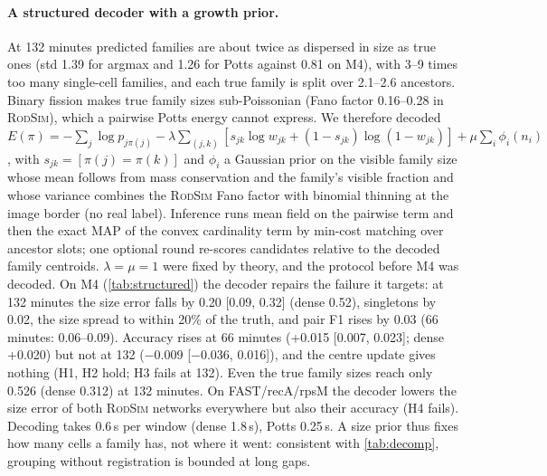 \documentclass[10pt,twocolumn,letterpaper]{article}
\newcommand{\rodsim}{\textsc{RodSim}\xspace}
\begin{document}
\paragraph{A structured decoder with a growth prior.}
At 132 minutes predicted families are about twice as dispersed in size as true ones (std 1.39 for argmax and 1.26 for Potts against 0.81 on M4), with 3--9 times too many single-cell families, and each true family is split over 2.1--2.6 ancestors. Binary fission makes true family sizes sub-Poissonian (Fano factor 0.16--0.28 in \rodsim), which a pairwise Potts energy cannot express. We therefore decoded
$E(\pi) = -\sum_j \log p_{j\pi(j)} - \lambda \sum_{(j,k)} [s_{jk}\log w_{jk} + (1{-}s_{jk})\log(1{-}w_{jk})] + \mu \sum_i \phi_i(n_i)$,
with $s_{jk}{=}[\pi(j){=}\pi(k)]$ and $\phi_i$ a Gaussian prior on the visible family size whose mean follows from mass conservation and the family's visible fraction and whose variance combines the \rodsim Fano factor with binomial thinning at the image border (no real label). Inference runs mean field on the pairwise term and then the exact MAP of the convex cardinality term by min-cost matching over ancestor slots; one optional round re-scores candidates relative to the decoded family centroids. $\lambda{=}\mu{=}1$ were fixed by theory, and the protocol before M4 was decoded. On M4 (\cref{tab:structured}) the decoder repairs the failure it targets: at 132 minutes the size error falls by 0.20 [0.09, 0.32] (dense 0.52), singletons by 0.02, the size spread to within 20\% of the truth, and pair F1 rises by 0.03 (66 minutes: 0.06--0.09). Accuracy rises at 66 minutes (+0.015 [0.007, 0.023]; dense +0.020) but not at 132 ($-$0.009 [$-$0.036, 0.016]), and the centre update gives nothing (H1, H2 hold; H3 fails at 132). Even the true family sizes reach only 0.526 (dense 0.312) at 132 minutes. On FAST/recA/rpsM the decoder lowers the size error of both \rodsim networks everywhere but also their accuracy (H4 fails). Decoding takes 0.6\,s per window (dense 1.8\,s), Potts 0.25\,s. A size prior thus fixes how many cells a family has, not where it went: consistent with \cref{tab:decomp}, grouping without registration is bounded at long gaps.

\end{document}
